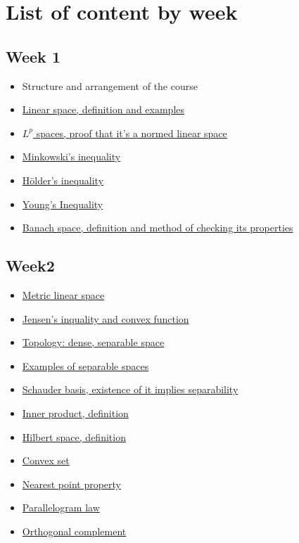 \newpage
\section{List of content by week}
\subsection{Week 1}
\begin{itemize}
	\item Structure and arrangement of the course
	\item \hyperref[vector space defs]{Linear space, definition and examples}
	\item \hyperref[lp space1]{$L^p$ spaces, proof that it's a normed linear space}
	\item \hyperref[Minkowski-holder]{Minkowski's inequality}
	\item \hyperref[Hölder's inequality]{Hölder's inequality}
	\item \hyperref[Young's Inequality]{Young's Inequality}
	\item \hyperref[banach space def]{Banach space, definition and method of checking its properties}
\end{itemize}
\subsection{Week2}
\begin{itemize}
	\item \hyperref[Metric linear space]{Metric linear space}
	\item \hyperref[Jensen's inquality]{Jensen's inquality and convex function}
	\item \hyperref[topology]{Topology: dense, separable space}
	\item \hyperref[separable space example]{Examples of separable spaces}
	\item \hyperref[Schauder basis]{Schauder basis, existence of it implies separability}
	\item \hyperref[Inner product]{Inner product, definition}
	\item \hyperref[Hilbert space def]{Hilbert space, definition}
	\item \hyperref[convexity]{Convex set}
	\item \hyperref[Nearest Point Property]{Nearest point property}
	      \item\hyperref[parallelogram]{Parallelogram law}
	\item \hyperref[ortho comp]{Orthogonal complement}
\end{itemize}

